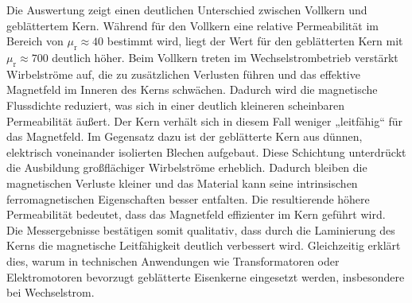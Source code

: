 \noindent Die Auswertung zeigt einen deutlichen Unterschied zwischen Vollkern und geblättertem Kern. Während für den Vollkern eine relative Permeabilität im Bereich von $\mu_\mathrm{r} \approx 40$ bestimmt wird, liegt der Wert für den geblätterten Kern mit $\mu_\mathrm{r} \approx 700$ deutlich höher. 
Beim Vollkern treten im Wechselstrombetrieb verstärkt Wirbelströme auf, die zu zusätzlichen Verlusten führen und das effektive Magnetfeld im Inneren des Kerns schwächen. Dadurch wird die magnetische Flussdichte reduziert, was sich in einer deutlich kleineren scheinbaren Permeabilität äußert. Der Kern verhält sich in diesem Fall weniger „leitfähig“ für das Magnetfeld.
Im Gegensatz dazu ist der geblätterte Kern aus dünnen, elektrisch voneinander isolierten Blechen aufgebaut. Diese Schichtung unterdrückt die Ausbildung großflächiger Wirbelströme erheblich. Dadurch bleiben die magnetischen Verluste kleiner und das Material kann seine intrinsischen ferromagnetischen Eigenschaften besser entfalten. Die resultierende höhere Permeabilität bedeutet, dass das Magnetfeld effizienter im Kern geführt wird.~\cite[S. 947]{Tipler} \\
Die Messergebnisse bestätigen somit qualitativ, dass durch die Laminierung des Kerns die magnetische Leitfähigkeit deutlich verbessert wird. Gleichzeitig erklärt dies, warum in technischen Anwendungen wie Transformatoren oder Elektromotoren bevorzugt geblätterte Eisenkerne eingesetzt werden, insbesondere bei Wechselstrom.
